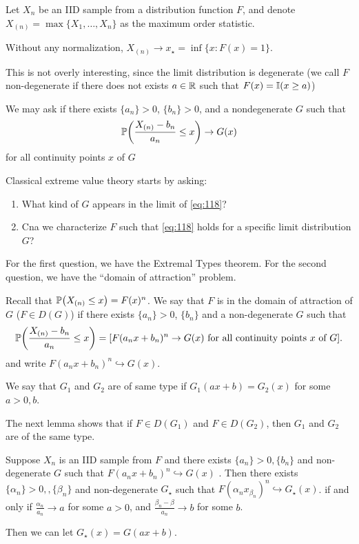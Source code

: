Let $X_{n}$ be an IID sample from a distribution function $F$, and
denote $X_{(n)} = \max \{ X_{1}, \dots, X_{n} \}$ as the maximum order
statistic.

Without any normalization, $X_{(n)} \rightarrow x_{\star} = \inf \{ x:
F(x) = 1 \}$.

This is not overly interesting, since the limit distribution is
degenerate (we call $F$ non-degenerate if there does not exists $a \in
\mathbb{R}$ such that $F(x) = \I{x \geq a}$)

We may ask if there exists $\{ a_{n} \} > 0$, $\{ b_{n} \} > 0$, and a
nondegenerate $G$ such that
\begin{equation}
  \label{eq:118}
  \Prob{\frac{X_{(n)} - b_{n}}{a_{n}} \leq x} \rightarrow G(x)  
\end{equation} for all continuity points $x$ of $G$

Classical extreme value theory starts by asking:
\begin{enumerate}
\item What kind of $G$ appears in the limit of \eqref{eq:118}?
\item Cna we characterize $F$ such that \eqref{eq:118} holds for a
  specific limit distribution $G$?
\end{enumerate}

For the first question, we have the Extremal Types theorem. For the
second question, we have the ``domain of attraction'' problem.

Recall that $\Prob{X_{(n)} \leq x} = F(x)^{n}$.  We say that $F$ is in
the domain of attraction of $G$ ($F \in D(G)$) if there exists $\{ a_{n} \} > 0$, $\{
b_{n} \} $ and a non-degenerate $G$ such that
\begin{equation}
  \label{eq:119}
  \Prob{\frac{X_{(n)} - b_{n}}{a_{n}} \leq x} = [\text{$F(a_{n} x +
    b_{n})^{n} \rightarrow G(x)$ for all continuity points $x$ of $G$}].
\end{equation} and write $F(a_{n} x + b_{n})^{n} \hookrightarrow G(x)$.

We say that $G_{1}$ and $G_{2}$ are of same type if $G_{1}(ax + b) =
G_{2}(x)$ for some $a > 0, b$.

The next lemma shows that if $F \in D(G_{1})$ and $F \in D(G_{2})$,
then $G_{1}$ and $G_{2}$ are of the same type.

\begin{lem}
  Suppose $X_{n}$ is an IID sample from $F$ and there exists $\{ a_{n}
  \} > 0, \{ b_{n} \}$ and non-degenerate $G$ such that $F(a_{n} x
  +b_{n})^{n} \hookrightarrow G(x)$ .  Then there exists $\{ \alpha_{n} \} > 0,
, \{ \beta_{n} \}$ and non-degenerate $G_{\star}$ such that
$F(\alpha_{n} x _{ \beta_{n}})^{n} \hookrightarrow G_{\star}(x)$. if and
only if $\frac{\alpha_{n}}{a_{n}} \rightarrow a$ for some $a > 0$, and
$\frac{\beta_{n} - \beta}{a_{n}} \rightarrow b$ for some $b$.

Then we can let $G_{\star}(x) = G(ax + b)$.
\end{lem}


